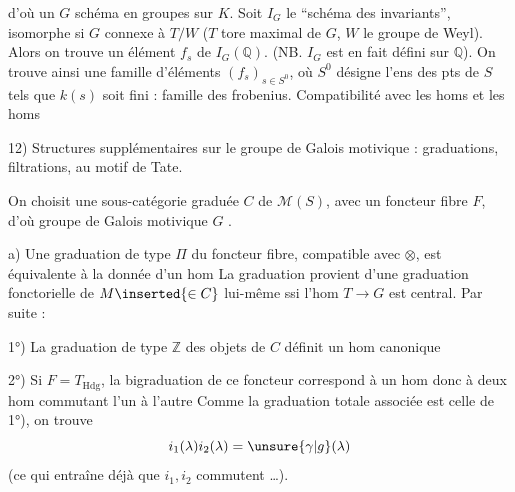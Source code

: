 d'où un $G$ schéma en groupes sur $K$. Soit
$I_G$ le ``schéma des invariants'', isomorphe si $G$ connexe
à $T/W$ ($T$ tore maximal de $G$, $W$ le groupe de Weyl).
Alors on trouve un élément $f_s$ de $I_G(\mathbb{Q})$.
(NB. $I_G$ est en fait défini sur $\mathbb{Q}$).
On trouve
ainsi une famille d'éléments $(f_s)_{s\in S^0}$, où $S^0$
désigne l'ens des pts de $S$ tels que $k(s)$ soit
fini : famille des frobenius. Compatibilité avec
les homs
et les homs

12) Structures supplémentaires sur le groupe de Galois
motivique : 
graduations, filtrations, au motif de Tate.

On choisit une sous-\inserted{$\otimes$-}catégorie graduée
$C$ de $\mathcal{M}(S)$, avec un foncteur fibre $F$,
d'où groupe de Galois motivique $G$
.

a) Une graduation de type $\Pi$ du foncteur fibre,
compatible avec $\otimes$, est équivalente à la donnée
d'un hom
La graduation provient d'une graduation fonctorielle
de $M\inserted{\in C}$ lui-même ssi l'hom $T\longrightarrow G$ est
central. Par suite :

1°) La graduation  de type $\mathbb{Z}$ des objets de
$C$ définit un hom canonique

2°) Si $F=T_{\mathrm{Hdg}}$, la bigraduation de ce
foncteur correspond à un hom
donc à deux hom commutant l'un à
l'autre
Comme la graduation totale associée est celle
de 1°), on trouve
\[
 i_1(\lambda)i_2(\lambda)=\unsure{\gamma|g}(\lambda)
\]
(ce qui entraîne déjà que $i_1,i_2$ commutent \dots).

